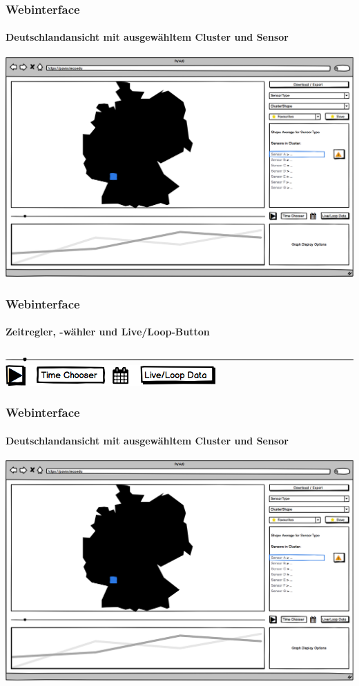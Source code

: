 \documentclass{beamer}
\begin{document}
\begin{frame}
	\frametitle{Webinterface}
	\framesubtitle{Deutschlandansicht mit ausgewähltem Cluster und Sensor}
	\centering
	\includegraphics[width=\linewidth]{gui/frontend/FrontGUIGermanyWithShapeSelection}
\end{frame}

\begin{frame}
	\frametitle{Webinterface}
	\framesubtitle{Zeitregler, -wähler und Live/Loop-Button}
	\centering
	\includegraphics[width=0.8\linewidth]{gui/frontend/FrontGUITimeSlider}\\[1cm]
	\includegraphics[width=0.5\linewidth]{gui/frontend/FrontGUITimeSetter}
\end{frame}

\begin{frame}
	\frametitle{Webinterface}
	\framesubtitle{Deutschlandansicht mit ausgewähltem Cluster und Sensor}
	\centering
	\includegraphics[width=\linewidth]{gui/frontend/FrontGUIGermanyWithShapeSelection}
\end{frame}
\end{document}
